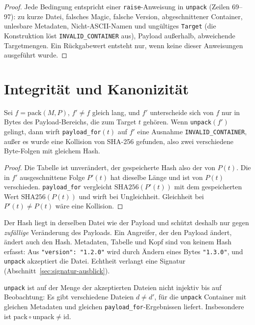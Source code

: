 \begin{proof}
	Jede Bedingung entspricht einer \texttt{raise}-Anweisung in \texttt{unpack} (Zeilen 69--97): zu kurze Datei, falsches Magic, falsche Version, abgeschnittener Container, unlesbare Metadaten, Nicht-ASCII-Namen und ungültiges \texttt{Target} (die Konstruktion löst \texttt{INVALID\_CONTAINER} aus), Payload außerhalb, abweichende Targetmengen. Ein Rückgabewert entsteht nur, wenn keine dieser Anweisungen ausgeführt wurde.
\end{proof}

\section{Integrität und Kanonizität}

\begin{satz}
	\label{satz:integritaet}
	Sei $f=\mathrm{pack}(M,P)$, $f'\ne f$ gleich lang, und $f'$ unterscheide sich von $f$ nur in Bytes des Payload-Bereichs, die zum Target $t$ gehören. Wenn \texttt{unpack}$(f')$ gelingt, dann wirft \texttt{payload\_for}$(t)$ auf $f'$ eine Ausnahme \texttt{INVALID\_CONTAINER}, außer es wurde eine Kollision von SHA-256 gefunden, also zwei verschiedene Byte-Folgen mit gleichem Hash.
\end{satz}

\begin{proof}
	Die Tabelle ist unverändert, der gespeicherte Hash also der von $P(t)$. Die in $f'$ ausgeschnittene Folge $P'(t)$ hat dieselbe Länge und ist von $P(t)$ verschieden. \texttt{payload\_for} vergleicht $\mathrm{SHA256}(P'(t))$ mit dem gespeicherten Wert $\mathrm{SHA256}(P(t))$ und wirft bei Ungleichheit. Gleichheit bei $P'(t)\ne P(t)$ wäre eine Kollision.
\end{proof}

\begin{bemerkung}
	\label{bem:hashgrenze}
	Der Hash liegt in derselben Datei wie der Payload und schützt deshalb nur gegen \emph{zufällige} Veränderung des Payloads. Ein Angreifer, der den Payload ändert, ändert auch den Hash. Metadaten, Tabelle und Kopf sind von keinem Hash erfasst: Aus \texttt{"version": "1.2.0"} wird durch Ändern eines Bytes \texttt{"1.3.0"}, und \texttt{unpack} akzeptiert die Datei. Echtheit verlangt eine Signatur (Abschnitt~\ref{sec:signatur-ausblick}).
\end{bemerkung}

\begin{satz}[Nichtkanonizität]
	\label{satz:kanon}
	\texttt{unpack} ist auf der Menge der akzeptierten Dateien nicht injektiv bis auf Beobachtung: Es gibt verschiedene Dateien $d\ne d'$, für die \texttt{unpack} Container mit gleichen Metadaten und gleichen \texttt{payload\_for}-Ergebnissen liefert. Insbesondere ist $\mathrm{pack}\circ\mathrm{unpack}\ne\mathrm{id}$.
\end{satz}

